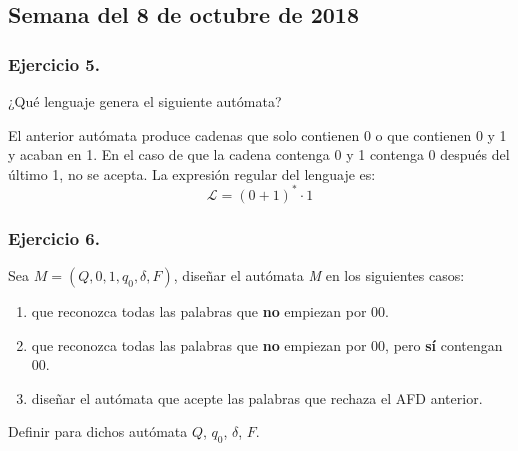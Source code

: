 \documentclass[11pt,a4paper]{article}
\begin{document}
\subsection{Semana del 8 de octubre de 2018}

\subsubsection{Ejercicio 5.} ¿Qué lenguaje genera el siguiente autómata?

\begin{figure}[H]
\centering
{}
\end{figure}

El anterior autómata produce cadenas que solo contienen 0 o que contienen 0 y 1 y acaban en 1. En el caso de que la cadena contenga 0 y 1 contenga 0 después del último 1, no se acepta. La expresión regular del lenguaje es:
	\[\mathcal{L}=(0+1)^{*}\cdot 1\]

\subsubsection{Ejercicio 6.} Sea $M = (Q, {0,1},q_0,\delta,F)$, diseñar el autómata \textit{M} en los siguientes casos:
	\begin{enumerate}
	\item que reconozca todas las palabras que \textbf{no} empiezan por 00.
	\item que reconozca todas las palabras que \textbf{no} empiezan por 00, pero \textbf{sí} contengan 00.
	\item diseñar el autómata que acepte las palabras que rechaza el AFD anterior.
	\end{enumerate}	
	
Definir para dichos autómata $Q$, $q_0$, $\delta$, $F$.\\
\end{document}
